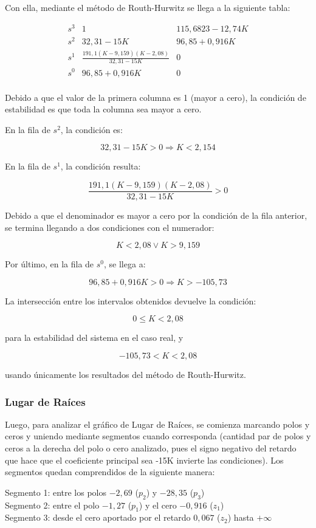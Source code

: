 \documentclass[12pt,a4paper]{article}
\begin{document}
Con ella, mediante el método de Routh-Hurwitz se llega a la siguiente tabla:

\[
\renewcommand{\arraystretch}{1.8}
\begin{array}{c|cc}
s^3 & 1 & 115,6823 - 12,74K \\
s^2 & 32,31 - 15K & 96,85 + 0,916K \\
\hline
s^1 & \frac{191,1(K - 9,159)(K - 2,08)}{32,31 - 15K} & 0 \\
s^0 & 96,85 + 0,916K & 0 \\
\end{array}
\]

Debido a que el valor de la primera columna es 1 (mayor a cero), la condición de estabilidad es que toda la columna sea mayor a cero. 

En la fila de $s^2$, la condición es:

\[
32,31 - 15 K > 0 \Rightarrow \boxed{K < 2,154}
\]

En la fila de $s^1$, la condición resulta:

\[
\frac{191,1(K-9,159)(K-2,08)}{32,31-15K} > 0
\]

Debido a que el denominador es mayor a cero por la condición de la fila anterior, se termina llegando a dos condiciones con el numerador:

\[
\boxed{K < 2,08 \lor K > 9,159}
\]

Por último, en la fila de $s^0$, se llega a:

\[
96,85+0,916K > 0 \Rightarrow \boxed{K>-105,73}
\]

La intersección entre los intervalos obtenidos devuelve la condición:

\[
\boxed{0 \leq K < 2,08}
\]

para la estabilidad del sistema en el caso real, y

\[
\boxed{-105,73 < K < 2,08}
\]

usando únicamente los resultados del método de Routh-Hurwitz.

\subsubsection*{Lugar de Raíces}

Luego, para analizar el gráfico de Lugar de Raíces, se comienza marcando polos y ceros y uniendo mediante segmentos cuando corresponda (cantidad par de polos y ceros a la derecha del polo o cero analizado, pues el signo negativo del retardo que hace que el coeficiente principal sea -15K invierte las condiciones).
Los segmentos quedan comprendidos de la siguiente manera:\\
\begin{flushleft}
Segmento 1: entre los polos $-2,69$ ($p_2$) y $-28,35$ ($p_3$) \\
Segmento 2: entre el polo $-1,27$ ($p_1$) y el cero $-0,916$ ($z_1$) \\
Segmento 3: desde el cero aportado por el retardo $0,067$ ($z_2$) hasta $+\infty$
\end{flushleft}
\end{document}
